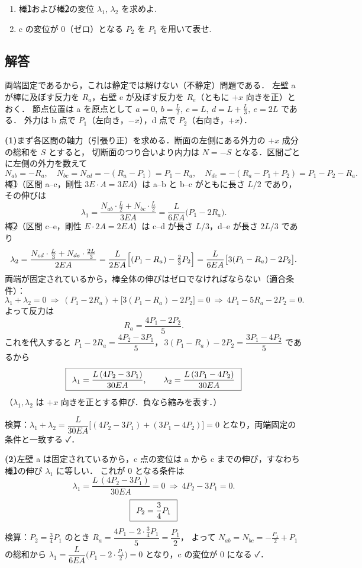 \documentclass[11pt,a4paper]{article}
\begin{document}
\begin{enumerate}[label=(\arabic*)]
  \item 棒\textcircled{1}および棒\textcircled{2}の変位 $\lambda_1$, $\lambda_2$ を求めよ.
  \item c の変位が 0（ゼロ）となる $P_2$ を $P_1$ を用いて表せ.
\end{enumerate}

\subsection*{解答}

両端固定であるから，これは静定では解けない（不静定）問題である．
左壁 a が棒に及ぼす反力を $R_a$，右壁 e が及ぼす反力を $R_e$（ともに $+x$ 向きを正）とおく．
節点位置は a を原点として $a=0,\ b=\tfrac{L}{2},\ c=L,\ d=L+\tfrac{L}{3},\ e=2L$ である．
外力は b 点で $P_1$（左向き，$-x$），d 点で $P_2$（右向き，$+x$）．

\medskip
\noindent\textbf{(1)}\quad まず各区間の軸力（引張り正）を求める．断面の左側にある外力の $+x$ 成分の総和を $S$ とすると，
切断面のつり合いより内力は $N=-S$ となる．区間ごとに左側の外力を数えて
\[
  N_{ab}=-R_a,\quad
  N_{bc}=N_{cd}=-(R_a-P_1)=P_1-R_a,\quad
  N_{de}=-(R_a-P_1+P_2)=P_1-P_2-R_a .
\]
棒\textcircled{1}（区間 a--c，剛性 $3E\!\cdot\!A=3EA$）は a--b と b--c がともに長さ $L/2$ であり，その伸びは
\[
  \lambda_1=\frac{N_{ab}\cdot\frac{L}{2}+N_{bc}\cdot\frac{L}{2}}{3EA}
  =\frac{L}{6EA}\bigl(P_1-2R_a\bigr).
\]
棒\textcircled{2}（区間 c--e，剛性 $E\!\cdot\!2A=2EA$）は c--d が長さ $L/3$，d--e が長さ $2L/3$ であり
\[
  \lambda_2=\frac{N_{cd}\cdot\frac{L}{3}+N_{de}\cdot\frac{2L}{3}}{2EA}
  =\frac{L}{2EA}\Bigl[(P_1-R_a)-\tfrac{2}{3}P_2\Bigr]
  =\frac{L}{6EA}\bigl[3(P_1-R_a)-2P_2\bigr].
\]
両端が固定されているから，棒全体の伸びはゼロでなければならない（適合条件）：
\[
  \lambda_1+\lambda_2=0
  \ \Longrightarrow\
  (P_1-2R_a)+\bigl[3(P_1-R_a)-2P_2\bigr]=0
  \ \Longrightarrow\
  4P_1-5R_a-2P_2=0 .
\]
よって反力は
\[
  R_a=\frac{4P_1-2P_2}{5}.
\]
これを代入すると $P_1-2R_a=\dfrac{4P_2-3P_1}{5}$，$\,3(P_1-R_a)-2P_2=\dfrac{3P_1-4P_2}{5}$ であるから
\[
  \boxed{\,\;\lambda_1=\frac{L\,(4P_2-3P_1)}{30EA},\qquad
        \lambda_2=\frac{L\,(3P_1-4P_2)}{30EA}\;\,}
\]
（$\lambda_1,\lambda_2$ は $+x$ 向きを正とする伸び．負なら縮みを表す．）

\smallskip
検算：$\lambda_1+\lambda_2=\dfrac{L}{30EA}\bigl[(4P_2-3P_1)+(3P_1-4P_2)\bigr]=0$ となり，両端固定の条件と一致する ✓．

\medskip
\noindent\textbf{(2)}\quad 左壁 a は固定されているから，c 点の変位は a から c までの伸び，すなわち棒\textcircled{1}の伸び $\lambda_1$ に等しい．
これが 0 となる条件は
\[
  \lambda_1=\frac{L\,(4P_2-3P_1)}{30EA}=0
  \ \Longrightarrow\
  4P_2-3P_1=0 .
\]
\[
  \boxed{\,\;P_2=\dfrac{3}{4}P_1\;\,}
\]
検算：$P_2=\tfrac34 P_1$ のとき $R_a=\dfrac{4P_1-2\cdot\frac34P_1}{5}=\dfrac{P_1}{2}$，
よって $N_{ab}=N_{bc}=-\tfrac{P_1}{2}+P_1$ の総和から $\lambda_1=\dfrac{L}{6EA}\bigl(P_1-2\cdot\tfrac{P_1}{2}\bigr)=0$ となり，c の変位が 0 になる ✓．
\end{document}
